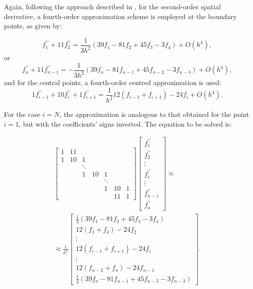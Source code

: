 \documentclass[preprint, 12pt]{elsarticle}
\begin{document}
Again, following the approach described in \citet{souza2003}, for the
second-order spatial derivative, a fourth-order approximation scheme is
employed at the boundary points, as given by:

\begin{equation}
    f_1^{\prime \prime} + 11f_{2}^{\prime \prime} = \frac{1}{3h^{2}}\left(39f_{1} - 81f_{2} + 45f_{3} - 3f_{4}\right)+O\left(h^4\right),
\end{equation}
or
\begin{equation}
    f_{n}^{\prime \prime} + 11f_{n-1}^{\prime \prime} = -\frac{1}{3h^{2}}\left(39f_{n} - 81f_{n-1} + 45f_{n-2} - 3f_{n-3}\right)+O\left(h^4\right),
\end{equation}
and for the central points, a fourth-order centred approximation is used:
\begin{equation}
    1 f_{i-1}^{\prime \prime}+10 f_i^{\prime \prime}+1 f_{i+1}^{\prime \prime}=\frac{1}{ h^2}12\left(f_{i-1} + f_{i+1}\right) -24f_{i}+O\left(h^4\right) .
\end{equation}

For the case $i=N$, the approximation is analogous to that obtained for the
point $i=1$, but with the coefficients' signs inverted. {\color{red} The equation to be
solved is:}

\begin{align}
\left[\begin{array}{ccccccc}
    1 & 11 & & & & & \\
    1 & 10 & 1 & & & & \\
    & & \ddots & & & & \\
    & & 1 & 10 & 1 & & \\
    & & & & \ddots & & \\
    & & & & 1 & 10 & 1 \\
    & & & & & 11 & 1
\end{array}\right]\left[\begin{array}{c}
    f_1^{\prime \prime} \\
    f_2^{\prime \prime} \\
    \vdots \\
    f_i^{\prime \prime} \\
    \vdots \\
    f_{n-1}^{\prime \prime} \\
    f_n^{\prime \prime}
\end{array}\right] \approx \nonumber\\ \approx \frac{1}{h^2}\left[\begin{array}{c}\frac{1}{3}\left(39f_1 - 81f_2 + 45f_3 - 3f_4\right) \\ 12\left(f_1 + f_3\right) -24f_2 \\ \vdots \\ 12\left(f_{i-1} + f_{i+1}\right) -24f_{i} \\ \vdots \\ 12\left(f_{n-2} + f_{n}\right) -24f_{n-1}  \\ \frac{1}{3}\left(39f_{n} - 81f_{n-1} + 45f_{n-2} - 3f_{n-3}\right)\end{array}\right].
\end{align}
\end{document}
